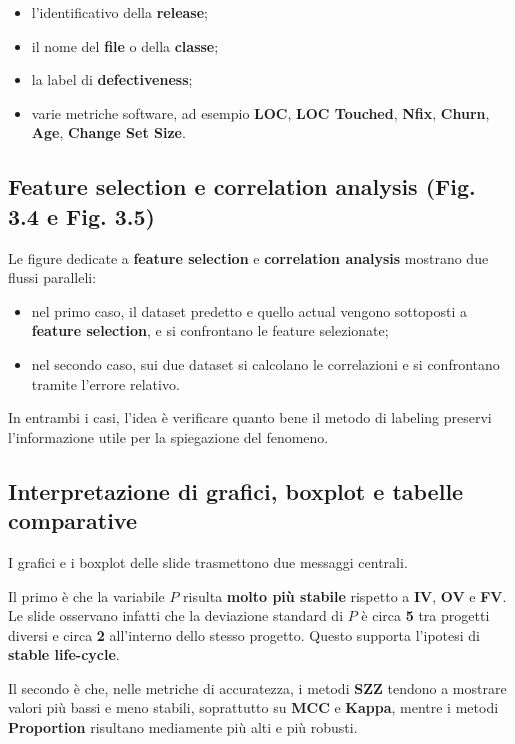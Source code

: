 \begin{itemize}
    \item l'identificativo della \textbf{release};
    \item il nome del \textbf{file} o della \textbf{classe};
    \item la label di \textbf{defectiveness};
    \item varie metriche software, ad esempio \textbf{LOC}, \textbf{LOC Touched}, \textbf{Nfix}, \textbf{Churn}, \textbf{Age}, \textbf{Change Set Size}.
\end{itemize}

\subsection{Feature selection e correlation analysis (Fig. 3.4 e Fig. 3.5)}

Le figure dedicate a \textbf{feature selection} e \textbf{correlation analysis} mostrano due flussi paralleli:

\begin{itemize}
    \item nel primo caso, il dataset predetto e quello actual vengono sottoposti a \textbf{feature selection}, e si confrontano le feature selezionate;
    \item nel secondo caso, sui due dataset si calcolano le correlazioni e si confrontano tramite l'errore relativo.
\end{itemize}

In entrambi i casi, l'idea è verificare quanto bene il metodo di labeling preservi l'informazione utile per la spiegazione del fenomeno.

\subsection{Interpretazione di grafici, boxplot e tabelle comparative}

I grafici e i boxplot delle slide trasmettono due messaggi centrali.

Il primo è che la variabile \textbf{\(P\)} risulta \textbf{molto più stabile} rispetto a \textbf{IV}, \textbf{OV} e \textbf{FV}. Le slide osservano infatti che la deviazione standard di \(P\) è circa \textbf{5} tra progetti diversi e circa \textbf{2} all'interno dello stesso progetto. Questo supporta l'ipotesi di \textbf{stable life-cycle}.

Il secondo è che, nelle metriche di accuratezza, i metodi \textbf{SZZ} tendono a mostrare valori più bassi e meno stabili, soprattutto su \textbf{MCC} e \textbf{Kappa}, mentre i metodi \textbf{Proportion} risultano mediamente più alti e più robusti.

